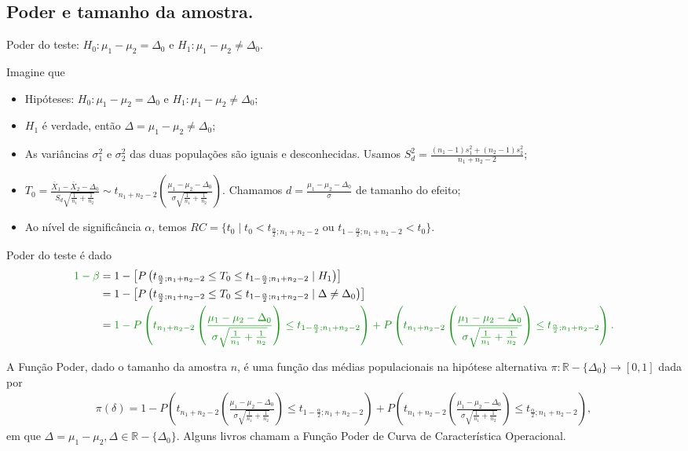 \documentclass[9pt]{beamer}
\begin{document}
\subsection{Poder e tamanho da amostra.}

\begin{frame}{Poder do teste: $H_0:\mu_1 - \mu_2 = \Delta_0$ e $H_1: \mu_1 - \mu_2 \neq \Delta_0$.}

\tiny

Imagine que
\begin{itemize}
	\item Hipóteses: $H_0: \mu_1 - \mu_2 = \Delta_0$ e $H_1: \mu_1 -  \mu_2 \neq \Delta_0$;
	\item $H_1$ é verdade, então $\Delta = \mu_1-\mu_2 \neq \Delta_0$;
	\item As variâncias $\sigma_1^2$  e $\sigma_2^2$ das duas populações são iguais e desconhecidas. Usamos $S_d^2 = \frac{(n_1-1)s_1^2 + (n_2-1)s_2^2}{n_1+n_2-2}$;
	\item $T_0 = \frac{\bar{X}_1 - \bar{X}_2 - \Delta_0}{ S_d \sqrt{ \frac{1}{n_1} + \frac{1}{n_2} } } \sim t_{n_1+n_2-2}\left( \frac{\mu_1 - \mu_2 - \Delta_0}{\sigma \sqrt{\frac{1}{n_1} + \frac{1}{n_2}}} \right)$. Chamamos $d = \frac{\mu_1-\mu_2-\Delta_0}{\sigma}$ de tamanho do efeito;
	\item Ao nível de significância $\alpha$, temos $RC = \{ t_0 \mid t_0 < t_{\frac{\alpha}{2};n_1+n_2-2} \mbox{ ou } t_{1-\frac{\alpha}{2};n_1+n_2-2} < t_0  \}$.
\end{itemize}
\vfill	

Poder do teste é dado
\begin{align*}
\textcolor{important}{1-\beta} &=1 - \left[P\left( t_{\frac{\alpha}{2};n_1+n_2-2} \leq T_0 \leq t_{1-\frac{\alpha}{2};n_1+n_2-2} \mid H_1 \right)\right]\\
&= 1 - \left[P\left( t_{\frac{\alpha}{2};n_1+n_2-2} \leq T_0 \leq t_{1-\frac{\alpha}{2};n_1+n_2-2} \mid \Delta \neq \Delta_0 \right)\right]\\
&= \textcolor{important}{1 - P\left( t_{n_1+n_2-2}\left( \frac{\mu_1 - \mu_2 - \Delta_0}{\sigma \sqrt{\frac{1}{n_1} + \frac{1}{n_2}}} \right) \leq t_{1-\frac{\alpha}{2};n_1+n_2-2} \right) + P\left( t_{n_1+n_2-2}\left( \frac{\mu_1 - \mu_2 - \Delta_0}{\sigma \sqrt{\frac{1}{n_1} + \frac{1}{n_2}}} \right) \leq t_{\frac{\alpha}{2};n_1+n_2-2} \right).}
\end{align*}
\vfill

A \textcolor{important}{Função Poder}, dado o tamanho da amostra $n$, é uma função das médias populacionais na hipótese alternativa  $\pi: \mathbb{R} - \{\Delta_0\} \longrightarrow [0,1]$ dada por
\begin{align*}
\pi(\delta) = 1 - P\left( t_{n_1+n_2-2}\left( \frac{\mu_1 - \mu_2 - \Delta_0}{\sigma \sqrt{\frac{1}{n_1} + \frac{1}{n_2}}} \right) \leq t_{1-\frac{\alpha}{2};n_1+n_2-2} \right) + P\left( t_{n_1+n_2-2}\left( \frac{\mu_1 - \mu_2 - \Delta_0}{\sigma \sqrt{\frac{1}{n_1} + \frac{1}{n_2}}} \right) \leq t_{\frac{\alpha}{2};n_1+n_2-2} \right),
\end{align*}
em que $\Delta = \mu_1 - \mu_2, \Delta \in \mathbb{R} - \{\Delta_0 \}$. Alguns livros chamam a Função Poder de \textcolor{important}{Curva de Característica Operacional.}


\end{frame}
\end{document}
